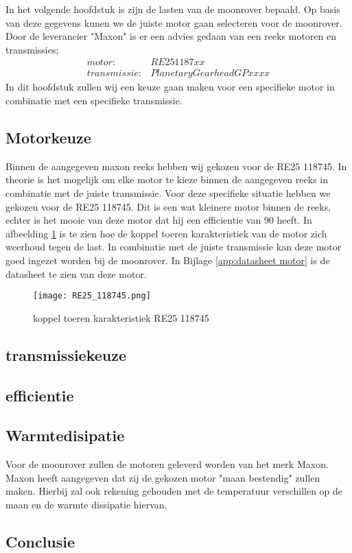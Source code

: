 In het volgende hoofdstuk is zijn de lasten van de moonrover bepaald. Op basis van deze gegevens kunen we de juiste motor gaan selecteren voor de moonrover. Door de leverancier "Maxon" is er een advies gedaan van een reeks motoren en transmissies;
\begin{align*}
        motor: &RE25 1187xx\\
        transmissie: &Planetary Gearhead GP xx xx
\end{align*}
In dit hoofdstuk zullen wij een keuze gaan maken voor een specifieke motor in combinatie met een specifieke transmissie.


\subsection{Motorkeuze}
Binnen de aangegeven maxon reeks hebben wij gekozen voor de RE25 118745. In theorie is het mogelijk om elke motor te kieze binnen de aangegeven reeks in combinatie met de juiste transmissie. Voor deze specifieke situatie hebben we gekozen voor de RE25 118745. Dit is een wat kleinere motor binnen de reeks, echter is het mooie van deze motor dat hij een efficientie van 90 heeft. In afbeelding \ref{fig:RE25_118745} is te zien hoe de koppel toeren karakteristiek van de motor zich weerhoud tegen de last. In combinatie met de juiste transmissie kan deze motor goed ingezet worden bij de moonrover. In Bijlage \ref{app:datasheet motor} is de datasheet te zien van deze motor.
\begin{figure}[H]
        \centering
        \texttt{[image: RE25\_118745.png]}
        \caption{koppel toeren karakteristiek RE25 118745}
        \label{fig:RE25_118745}
    \end{figure}

\subsection{transmissiekeuze}

\subsection{efficientie}



\subsection{Warmtedisipatie}

Voor de moonrover zullen de motoren geleverd worden van het merk Maxon. Maxon heeft aangegeven dat zij de gekozen motor "maan bestendig" zullen maken. Hierbij zal ook rekening gehouden met de temperatuur verschillen op de maan en de warmte dissipatie hiervan. 

\subsection{Conclusie}